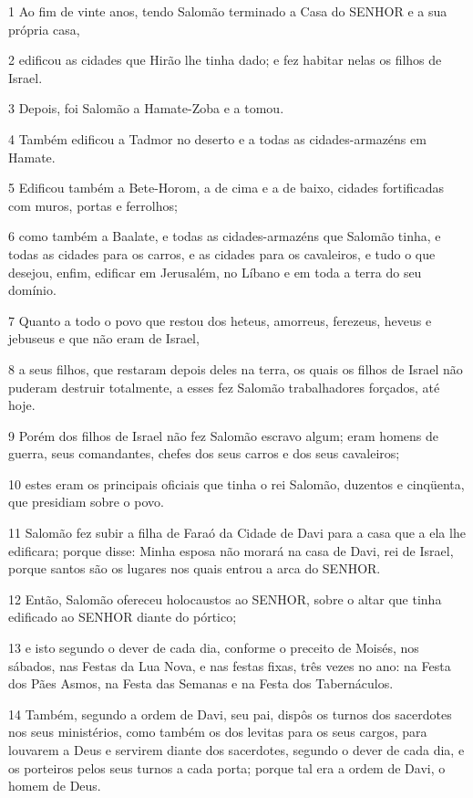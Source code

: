 \par 1 Ao fim de vinte anos, tendo Salomão terminado a Casa do SENHOR e a sua própria casa,
\par 2 edificou as cidades que Hirão lhe tinha dado; e fez habitar nelas os filhos de Israel.
\par 3 Depois, foi Salomão a Hamate-Zoba e a tomou.
\par 4 Também edificou a Tadmor no deserto e a todas as cidades-armazéns em Hamate.
\par 5 Edificou também a Bete-Horom, a de cima e a de baixo, cidades fortificadas com muros, portas e ferrolhos;
\par 6 como também a Baalate, e todas as cidades-armazéns que Salomão tinha, e todas as cidades para os carros, e as cidades para os cavaleiros, e tudo o que desejou, enfim, edificar em Jerusalém, no Líbano e em toda a terra do seu domínio.
\par 7 Quanto a todo o povo que restou dos heteus, amorreus, ferezeus, heveus e jebuseus e que não eram de Israel,
\par 8 a seus filhos, que restaram depois deles na terra, os quais os filhos de Israel não puderam destruir totalmente, a esses fez Salomão trabalhadores forçados, até hoje.
\par 9 Porém dos filhos de Israel não fez Salomão escravo algum; eram homens de guerra, seus comandantes, chefes dos seus carros e dos seus cavaleiros;
\par 10 estes eram os principais oficiais que tinha o rei Salomão, duzentos e cinqüenta, que presidiam sobre o povo.
\par 11 Salomão fez subir a filha de Faraó da Cidade de Davi para a casa que a ela lhe edificara; porque disse: Minha esposa não morará na casa de Davi, rei de Israel, porque santos são os lugares nos quais entrou a arca do SENHOR.
\par 12 Então, Salomão ofereceu holocaustos ao SENHOR, sobre o altar que tinha edificado ao SENHOR diante do pórtico;
\par 13 e isto segundo o dever de cada dia, conforme o preceito de Moisés, nos sábados, nas Festas da Lua Nova, e nas festas fixas, três vezes no ano: na Festa dos Pães Asmos, na Festa das Semanas e na Festa dos Tabernáculos.
\par 14 Também, segundo a ordem de Davi, seu pai, dispôs os turnos dos sacerdotes nos seus ministérios, como também os dos levitas para os seus cargos, para louvarem a Deus e servirem diante dos sacerdotes, segundo o dever de cada dia, e os porteiros pelos seus turnos a cada porta; porque tal era a ordem de Davi, o homem de Deus.
